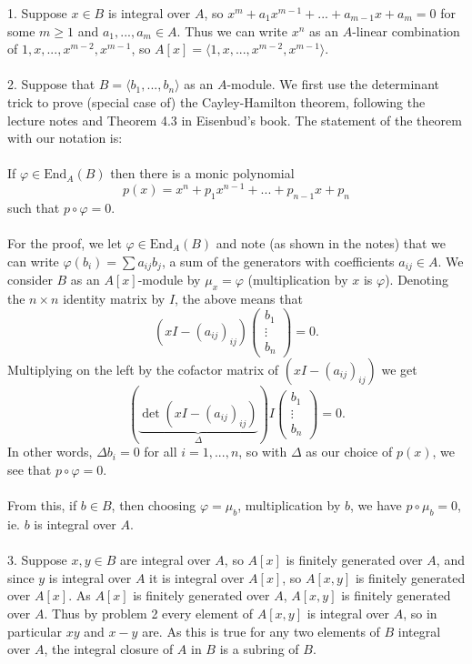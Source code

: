 \documentclass{article}
\newcommand{\End}{\text{End}}
\begin{document}
\large 

\vspace{0.05in}

1. Suppose $x \in B$ is integral over $A$, so $x^m + a_1x^{m-1} + ... + a_{m-1}x + a_m = 0$ for some $m\geq 1$ and $a_1,...,a_m \in A$. Thus we can write $x^n$ as an $A$-linear combination of $1, x, ..., x^{m-2}, x^{m-1}$, so $A[x] = \langle 1, x, ..., x^{m-2}, x^{m-1} \rangle$.
\\ \\ 
2. Suppose that $B = \langle b_1,...,b_n \rangle $ as an $A$-module. We first use the determinant trick to prove (special case of) the Cayley-Hamilton theorem, following the lecture notes and Theorem 4.3 in Eisenbud's book. The statement of the theorem with our notation is: \\ \\
If $\varphi \in \End_A(B)$ then there is a monic polynomial 
\[
p(x) = x^n + p_1 x^{n-1} + ... + p_{n-1}x+p_n
\]
such that $p \circ \varphi = 0$. \\ \\
For the proof, we let $\varphi\in \End_A(B)$ and note (as shown in the notes) that we can write $\varphi(b_i) = \sum a_{ij} b_j$, a sum of the generators with coefficients $a_{ij} \in A$. We consider $B$ as an $A[x]$-module by $\mu_x=\varphi$ (multiplication by $x$ is $\varphi$). Denoting the $n\times n$ identity matrix by $I$, the above means that 
\[
(xI - (a_{ij})_{ij})\begin{pmatrix} b_1\\
\vdots \\
b_n
\end{pmatrix}=0.
\]
Multiplying on the left by the cofactor matrix of $(xI - (a_{ij})_{ij})$ we get 
\[
(\underbrace{\det(xI-(a_{ij})_{ij})}_{\Delta})I\begin{pmatrix}b_1 \\
\vdots \\
b_n 
\end{pmatrix}=0.
\]
In other words, $\Delta b_i = 0$ for all $i =1,...,n$, so with $\Delta$ as our choice of $p(x)$, we see that $p\circ \varphi = 0$. \\ \\
From this, if $b \in B$, then choosing $\varphi = \mu_b$, multiplication by $b$, we have $p \circ \mu_b = 0$, ie. $b$ is integral over $A$.
\\ \\
3. Suppose $x, y \in B$ are integral over $A$, so $A[x]$ is finitely generated over $A$, and since $y$ is integral over $A$ it is integral over $A[x]$, so $A[x,y]$ is finitely generated over $A[x]$. As $A[x]$ is finitely generated over $A$, $A[x,y]$ is finitely generated over $A$. Thus by problem 2 every element of $A[x,y]$ is integral over $A$, so in particular $xy$ and $x-y$ are. As this is true for any two elements of $B$ integral over $A$, the integral closure of $A$ in $B$ is a subring of $B$.
\end{document}
